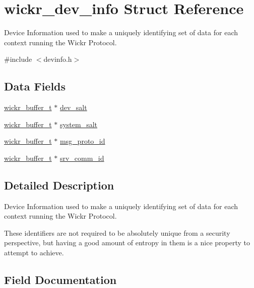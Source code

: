 \hypertarget{structwickr__dev__info}{}\section{wickr\+\_\+dev\+\_\+info Struct Reference}
\label{structwickr__dev__info}


Device Information used to make a uniquely identifying set of data for each context running the Wickr Protocol.  




{\ttfamily \#include $<$devinfo.\+h$>$}

\subsection*{Data Fields}
\begin{DoxyCompactItemize}
\item 
\hyperlink{structwickr__buffer}{wickr\+\_\+buffer\+\_\+t} $\ast$ \hyperlink{structwickr__dev__info_a78032877515c2b4cf67c48e4eb6fb0f7}{dev\+\_\+salt}
\item 
\hyperlink{structwickr__buffer}{wickr\+\_\+buffer\+\_\+t} $\ast$ \hyperlink{structwickr__dev__info_a084d0cd9e73d9f74f62c9e9abb85436f}{system\+\_\+salt}
\item 
\hyperlink{structwickr__buffer}{wickr\+\_\+buffer\+\_\+t} $\ast$ \hyperlink{structwickr__dev__info_a864ad03c4d10f51fe6251059007276d2}{msg\+\_\+proto\+\_\+id}
\item 
\hyperlink{structwickr__buffer}{wickr\+\_\+buffer\+\_\+t} $\ast$ \hyperlink{structwickr__dev__info_af5f2ff06ae74fcec85106f6ffd77c008}{srv\+\_\+comm\+\_\+id}
\end{DoxyCompactItemize}


\subsection{Detailed Description}
Device Information used to make a uniquely identifying set of data for each context running the Wickr Protocol. 

These identifiers are not required to be absolutely unique from a security perspective, but having a good amount of entropy in them is a nice property to attempt to achieve. 

\subsection{Field Documentation}
\mbox{\label{structwickr__dev__info_a78032877515c2b4cf67c48e4eb6fb0f7}} 
